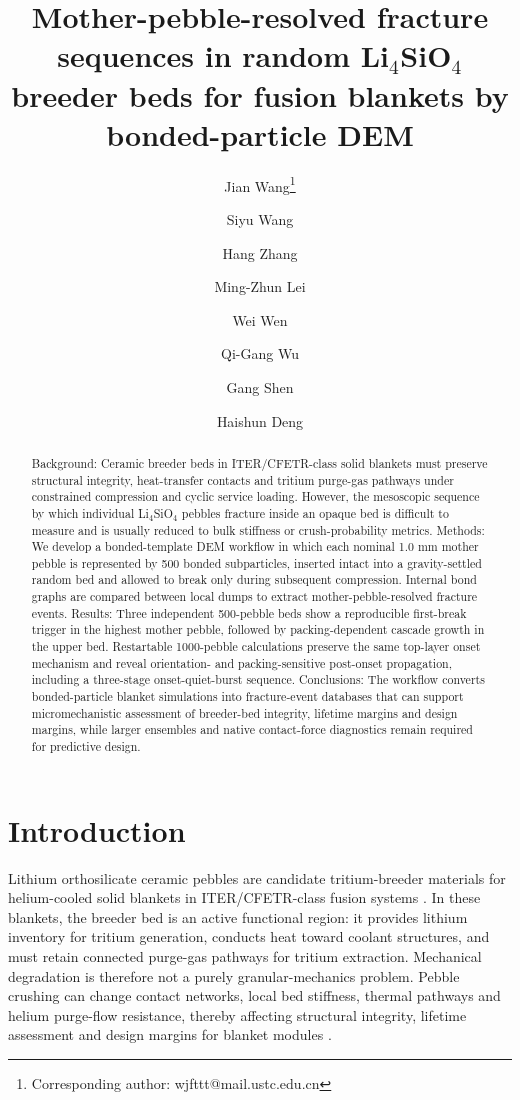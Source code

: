 \documentclass[10pt,twocolumn]{article}
\title{Mother-pebble-resolved fracture sequences in random Li$_4$SiO$_4$ breeder beds for fusion blankets by bonded-particle DEM}
\author[1,2]{Jian Wang\thanks{Corresponding author: wjfttt@mail.ustc.edu.cn}}
\author[1]{Siyu Wang}
\author[1]{Hang Zhang}
\author[2]{Ming-Zhun Lei}
\author[1,2]{Wei Wen}
\author[2]{Qi-Gang Wu}
\author[1]{Gang Shen}
\author[1]{Haishun Deng}
\affil[1]{Anhui University of Science and Technology, Huainan, Anhui 232001, China}
\affil[2]{Institute of Plasma Physics, Chinese Academy of Sciences, Hefei, Anhui 230031, China}
\date{}
\begin{document}
\maketitle











\begin{abstract}

Background: Ceramic breeder beds in ITER/CFETR-class solid blankets must preserve structural integrity, heat-transfer contacts and tritium purge-gas pathways under constrained compression and cyclic service loading. However, the mesoscopic sequence by which individual Li$_4$SiO$_4$ pebbles fracture inside an opaque bed is difficult to measure and is usually reduced to bulk stiffness or crush-probability metrics. Methods: We develop a bonded-template DEM workflow in which each nominal 1.0 mm mother pebble is represented by 500 bonded subparticles, inserted intact into a gravity-settled random bed and allowed to break only during subsequent compression. Internal bond graphs are compared between local dumps to extract mother-pebble-resolved fracture events. Results: Three independent 500-pebble beds show a reproducible first-break trigger in the highest mother pebble, followed by packing-dependent cascade growth in the upper bed. Restartable 1000-pebble calculations preserve the same top-layer onset mechanism and reveal orientation- and packing-sensitive post-onset propagation, including a three-stage onset-quiet-burst sequence. Conclusions: The workflow converts bonded-particle blanket simulations into fracture-event databases that can support micromechanistic assessment of breeder-bed integrity, lifetime margins and design margins, while larger ensembles and native contact-force diagnostics remain required for predictive design.


\end{abstract}

\section{Introduction}

Lithium orthosilicate ceramic pebbles are candidate tritium-breeder materials for helium-cooled solid blankets in ITER/CFETR-class fusion systems \cite{Piazza2002CeramicBreederMaterials,Reimann2000ThermomechanicalPebbleBeds}. In these blankets, the breeder bed is an active functional region: it provides lithium inventory for tritium generation, conducts heat toward coolant structures, and must retain connected purge-gas pathways for tritium extraction. Mechanical degradation is therefore not a purely granular-mechanics problem. Pebble crushing can change contact networks, local bed stiffness, thermal pathways and helium purge-flow resistance, thereby affecting structural integrity, lifetime assessment and design margins for blanket modules \cite{CrushedPebblePressureDrop2024}.
\end{document}
